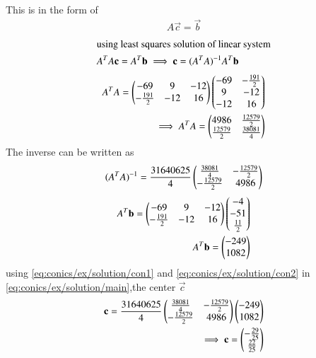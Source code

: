 \begin{enumerate}
\begin{align}
\end{align}
 This is in the form of 
 \begin{align}
 {A}\vec{c}=\vec{b}
 \end{align}
  \begin{align} 
 \intertext{using least squares solution of linear system}
 {A}^T{A}\vec{c}={A}^T\vec{b}
 \implies \vec{c}=  ({{A}^T{A}})^{-1} {A}^T\vec{b} \label{eq:conics/ex/solution/main}
\end{align}
\begin{align}
{A}^T{A}=\myvec{-69 & 9 & -12 \\ -\frac{191}{2}& -12& 16 }
 \myvec{-69& -\frac{191}{2} \\ 9 & -12 \\  -12 & 16 } \nonumber \\ \implies
 {A}^T{A}=\myvec{4986& \frac{12579}{2} \\  \frac{12579}{2} & \frac{38081}{4} }
\end{align}
The inverse can be written as
\begin{align}
    ({{A}^T{A}})^{-1}=\frac{31640625}{4}
    \myvec{\frac{38081}{4}&- \frac{12579}{2} \\  -\frac{12579}{2} & 4986}\label{eq:conics/ex/solution/con1}
\end{align} 
\begin{align}
   {A}^T\vec{b} = \myvec{-69 & 9 & -12 \\ -\frac{191}{2}& -12& 16 }\myvec{-4 \\ -51 \\ \frac{11}{2}} \nonumber \\
   {A}^T\vec{b} =\myvec{-249 \\ 1082} \label{eq:conics/ex/solution/con2}
\end{align}
using \ref{eq:conics/ex/solution/con1} and \ref{eq:conics/ex/solution/con2} in \ref{eq:conics/ex/solution/main},the center $\vec{c}$
\begin{align}
    \vec{c}=\frac{31640625}{4}
    \myvec{\frac{38081}{4}&- \frac{12579}{2} \\  -\frac{12579}{2} & 4986}\myvec{-249 \\ 1082} \\
    \implies \vec{c}=\myvec{-\frac{29}{25} \\ \frac{22}{25}} 
\end{align}


\end{enumerate}
